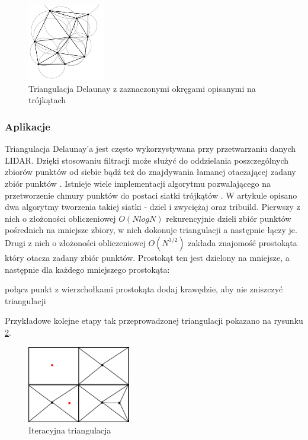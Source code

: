 \begin{figure}[h!]
    \centering
    \includegraphics[width=0.3\textwidth]{img/triangulacja.jpg}
    \caption{Triangulacja Delaunay z zaznaczonymi okręgami opisanymi na trójkątach}
    \label{fig:triangulacja}
\end{figure}

\subsubsection{Aplikacje}
Triangulacja Delaunay'a jest często wykorzystywana przy przetwarzaniu danych LIDAR. Dzięki stosowaniu filtracji może służyć do oddzielania poszczególnych zbiorów punktów od siebie \cite{koziol2007} bądź też do znajdywania łamanej otaczającej zadany zbiór punktów \cite{website:HumanGeoBlog}. Istnieje wiele implementacji algorytmu pozwalającego na przetworzenie chmury punktów do postaci siatki trójkątów \cite{Lee1980,Dwyer1987,jiang2010}. W artykule \cite{Lee1980} opisano dwa algorytmy tworzenia takiej siatki - dziel i zwyciężaj oraz tribuild. Pierwszy z nich o złożoności obliczeniowej $O(N log N)$ rekurencyjnie dzieli zbiór punktów pośrednich na mniejsze zbiory, w nich dokonuje triangulacji a następnie łączy je. Drugi z nich o złożoności obliczeniowej $O(N^{3/2})$ zakłada znajomość prostokąta który otacza zadany zbiór punktów. Prostokąt ten jest dzielony na mniejsze, a następnie dla każdego mniejszego prostokąta:
\begin{algorithmic}
        \State połącz punkt z wierzchołkami prostokąta
    \Else
        \State dodaj krawędzie, aby nie zniszczyć triangulacji
    \EndIf
    \EndFor
\end{algorithmic}

Przykładowe kolejne etapy tak przeprowadzonej triangulacji pokazano na rysunku \ref{fig:iter_triangulacja}.

\begin{figure}[h!]
    \centering
    \includegraphics[width=0.4\textwidth]{img/iter_triangulacja.jpg}
    \caption{Iteracyjna triangulacja}
    \label{fig:iter_triangulacja}
\end{figure}

